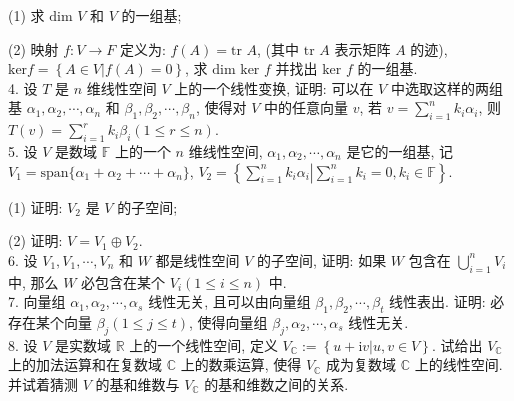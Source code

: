 \documentclass[UTF8]{ctexart}
\begin{document}
(1) 求 $\text{dim }V$ 和 $V$ 的一组基;

(2) 映射 $f : V \rightarrow F$ 定义为: $f(A)=\text{tr }A$, (其中 $\text{tr }A$ 表示矩阵 $A$ 的迹), $\text{ker}f=\left\{A\in V \left| f(A)=0\right\}\right.$, 求 $\text{dim ker }f$ 并找出 $\text{ker }f$ 的一组基.
\\

4. 设 $T$ 是 $n$ 维线性空间 $V$ 上的一个线性变换, 证明: 可以在 $V$ 中选取这样的两组基 $\alpha_1,\alpha_2,\cdots,\alpha_n$ 和 $\beta_1,\beta_2,\cdots,\beta_n$, 使得对 $V$ 中的任意向量 $v$, 若 $v=\displaystyle\sum_{i=1}^{n}k_i\alpha_i$, 则 $T(v)=\displaystyle\sum_{i=1}^{r}k_i\beta_i(1\leq r\leq n)$.
\\

5. 设 $V$ 是数域 $\mathbb{F}$ 上的一个 $n$ 维线性空间, $\alpha_1,\alpha_2,\cdots,\alpha_n$ 是它的一组基, 记$V_1=\text{span}\{\alpha_1+\alpha_2+\cdots+\alpha_n\}$,  $V_2=\displaystyle\left\{\sum_{i=1}^{n}k_i\alpha_i \left| \sum_{i=1}^{n}k_i=0, k_i\in\mathbb{F}\right\}\right.$.

(1) 证明: $V_2$ 是 $V$ 的子空间;

(2) 证明: $V=V_1\oplus V_2$.
\\

6. 设 $V_1,V_1,\cdots,V_n$ 和 $W$ 都是线性空间 $V$ 的子空间, 证明: 如果 $W$ 包含在 $\displaystyle\bigcup_{i=1}^{n}V_i$ 中, 那么 $W$ 必包含在某个 $V_i(1\leq i\leq n)$ 中.
\\

7. 向量组 $\alpha_1,\alpha_2,\cdots,\alpha_s$ 线性无关, 且可以由向量组 $\beta_1,\beta_2,\cdots,\beta_t$ 线性表出. 证明: 必存在某个向量 $\beta_j(1\leq j\leq t)$, 使得向量组 $\beta_j,\alpha_2,\cdots,\alpha_s$ 线性无关.
\\

8. 设 $V$ 是实数域 $\mathbb{R}$ 上的一个线性空间, 定义 $V_{\mathbb{C}}:=\left\{u+\text{i}v\left|u,v\in V\right\}\right.$. 试给出 $V_{\mathbb{C}}$ 上的加法运算和在复数域 $\mathbb{C}$ 上的数乘运算, 使得 $V_{\mathbb{C}}$ 成为复数域 $\mathbb{C}$ 上的线性空间. 并试着猜测 $V$ 的基和维数与 $V_{\mathbb{C}}$ 的基和维数之间的关系.
\end{document}
